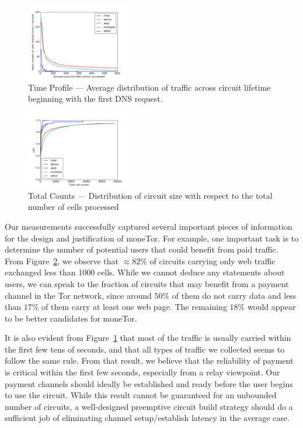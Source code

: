 \begin{figure} \centering
  \includegraphics[width=0.4\textwidth]{images/exitmeasurement.png}
  \caption{Time Profile --- Average distribution of traffic across circuit
    lifetime beginning with the first DNS request.}
  \label{fig:statsa}
\end{figure}
\begin{figure} \centering
  \includegraphics[width=0.4\textwidth]{images/totcellcountscdf.png}
  \caption{Total Counts --- Distribution of circuit size with respect to the
    total number of cells processed}
\label{fig:statsb}
\end{figure}


Our measurements successfully captured several important pieces of information
for the design and justification of moneTor. For example, one important task is
to determine the number of potential users that could benefit from paid
traffic. From Figure~\ref{fig:statsb}, we observe that $\approx 82\%$ of
circuits carrying only web traffic exchanged less than 1000 cells. While we
cannot deduce any statements about users, we can speak to the fraction of
circuits that may benefit from a payment channel in the Tor network, since
around $50\%$ of them do not carry data and less than $17\%$ of them carry at
least one web page. The remaining $18\%$ would appear to be better candidates
for moneTor.

It is also evident from Figure~\ref{fig:statsa} that most of the traffic is usually
carried within the first few tens of seconds, and that all types of traffic we
collected seems to follow the same rule. From that result, we believe that the
reliability of payment is critical within the first few seconds, especially from
a relay viewpoint. Our payment channels should ideally be established and ready
before the user begins to use the circuit. While this result cannot be
guaranteed for an unbounded number of circuits, a well-designed preemptive
circuit build strategy should do a sufficient job of eliminating channel
setup/establish latency in the average case.

